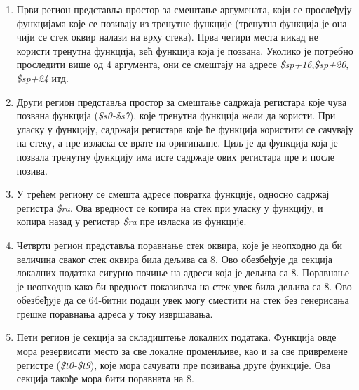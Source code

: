 \documentclass[12pt,oneside]{memoir}
\begin{document}
\begin{enumerate}

\item Први регион представља простор за смештање аргумената, који се прослеђују функцијама које се позивају из тренутне функције (тренутна функција је она чији се стек оквир налази на врху стека). Прва четири места никад не користи тренутна функција, већ функција која је позвана. Уколико је потребно проследити више од 4 аргумента, они се смештају на адресе \textit{\$sp+16},\textit{\$sp+20}, \textit{\$sp+24} итд.

\item Други регион представља простор за смештање садржаја регистара које чува позвана функција (\textit{\$s0-\$s7}), које тренутна функција жели да користи. При уласку у функцију, садржаји регистара које ће функција користити се сачувају на стеку, а пре изласка се врате на оригиналне. Циљ је да функција која је позвала тренутну функцију има исте садржаје ових регистара пре и после позива.

\item У трећем региону се смешта адресе повратка функције, односно садржај регистра \textit{\$ra}. Ова вредност се копира на стек при уласку у функцију, и копира назад у регистар  \textit{\$ra} пре изласка из функције.

\item Четврти регион представља поравнање стек оквира, које је неопходно да би величина сваког стек оквира била дељива са 8. Ово обезбеђује да секција локалних података сигурно почиње на адреси која је дељива са 8. Поравнање је неопходно како би вредност показивача на стек увек била дељива са 8. Ово обезбеђује да се 64-битни подаци увек могу сместити на стек без генерисања грешке поравнања адреса у току извршавања.

\item Пети регион је секција за складиштење локалних података. Функција овде мора резервисати место за све локалне променљиве, као и за све привремене регистре (\textit{\$t0-\$t9}), које мора сачувати пре позивања друге функције. Ова секција такође мора бити поравната на 8.
\end{enumerate}
\end{document}
